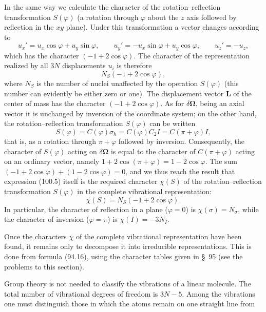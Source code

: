 In the same way we calculate the character of the rotation--reflection transformation $S(\varphi)$ (a rotation through $\varphi$ about the $z$ axis followed by reflection in the $xy$ plane). Under this transformation a vector changes according to
\[
 u_x'=u_x\cos\varphi+u_y\sin\varphi,\qquad
 u_y'=-u_x\sin\varphi+u_y\cos\varphi,\qquad
 u_z'=-u_z,
\]
which has the character $(-1+2\cos\varphi)$. The character of the representation realized by all $3N$ displacements $u_i$ is therefore
\begin{equation}
 N_S(-1+2\cos\varphi), \tag{100.5}
\end{equation}
where $N_S$ is the number of nuclei unaffected by the operation $S(\varphi)$ (this number can evidently be either zero or one). The displacement vector $\mathbf L$ of the center of mass has the character $(-1+2\cos\varphi)$. As for $\delta\boldsymbol\Omega$, being an axial vector it is unchanged by inversion of the coordinate system; on the other hand, the rotation--reflection transformation $S(\varphi)$ can be written
\[
 S(\varphi)=C(\varphi)\sigma_h=C(\varphi)C_2I=C(\pi+\varphi)I,
\]
that is, as a rotation through $\pi+\varphi$ followed by inversion. Consequently, the character of $S(\varphi)$ acting on $\delta\boldsymbol\Omega$ is equal to the character of $C(\pi+\varphi)$ acting on an ordinary vector, namely $1+2\cos(\pi+\varphi)=1-2\cos\varphi$. The sum $(-1+2\cos\varphi)+(1-2\cos\varphi)=0$, and we thus reach the result that expression (100.5) itself is the required character $\chi(S)$ of the rotation--reflection transformation $S(\varphi)$ in the complete vibrational representation:
\begin{equation}
 \chi(S)=N_S(-1+2\cos\varphi). \tag{100.6}
\end{equation}
In particular, the character of reflection in a plane ($\varphi=0$) is $\chi(\sigma)=N_\sigma$, while the character of inversion ($\varphi=\pi$) is $\chi(I)=-3N_I$.

Once the characters $\chi$ of the complete vibrational representation have been found, it remains only to decompose it into irreducible representations. This is done from formula (94.16), using the character tables given in \S~95 (see the problems to this section).

Group theory is not needed to classify the vibrations of a linear molecule. The total number of vibrational degrees of freedom is $3N-5$. Among the vibrations one must distinguish those in which the atoms remain on one straight line from

